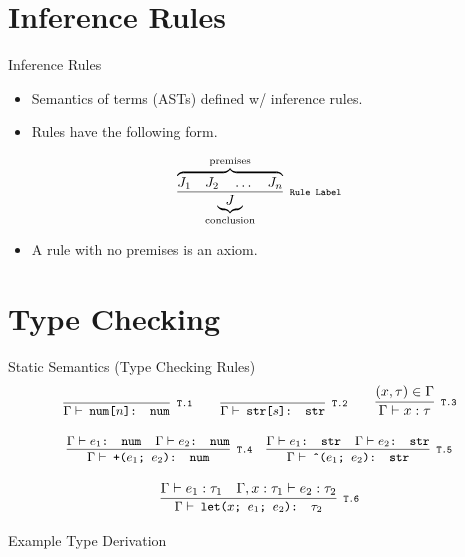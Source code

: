 \documentclass{beamer}
\begin{document}
\section{Inference Rules}

\begin{frame}{Inference Rules}
\begin{itemize}
\item Semantics of terms (ASTs) defined w/ inference rules.
\item Rules have the following form.
\end{itemize}

\[
\infer[Rule Label]{\underbrace{J}_{\text{conclusion}}}
      {\overbrace{J_1 \quad J_2 \quad \ldots \quad J_n}^{\text{premises}}}
\]

\begin{itemize}
\item A rule with no premises is an axiom.
\end{itemize}
\end{frame}

\section{Type Checking}

\begin{frame}{Static Semantics (Type Checking Rules)}
\[
\cinfer[T.1]{$\Gamma \vdash$ num[$n$]: num}{ }
\qquad
\cinfer[T.2]{$\Gamma \vdash$ str[$s$]: str}{ }
\qquad
\infer[T.3]{\Gamma \vdash x: \tau}{(x, \tau) \in \Gamma}
\]

\[
\cinfer[T.4]{$\Gamma \vdash$ +($e_1$; $e_2$): num}
  {\code{$\Gamma \vdash e_1$: num} & \code{$\Gamma \vdash e_2$: num}}
\quad
\cinfer[T.5]{$\Gamma \vdash$ \^{}($e_1$; $e_2$): str}
  {\code{$\Gamma \vdash e_1$: str} & \code{$\Gamma \vdash e_2$: str}}
\]

\[
\cinfer[T.6]{$\Gamma \vdash$ let($x$; $e_1$; $e_2$): $\tau_2$}
  {\Gamma \vdash e_1: \tau_1
   &
   \Gamma , x : \tau_1 \vdash e_2 : \tau_2
  }
\]
\end{frame}


\begin{frame}{Example Type Derivation}
\begin{center}
\end{center}
\end{frame}
\end{document}

